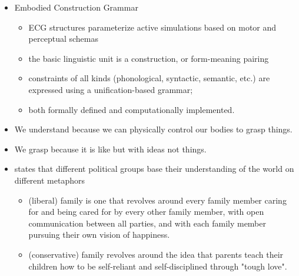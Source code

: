 \documentclass[a4paper,landscape,headrule,footrule,xetex]{foils}
\begin{document}
\begin{itemize}
\item Embodied Construction Grammar
  \begin{itemize}
  \item  {} ECG structures parameterize active simulations based on motor and perceptual schemas
  \item {} the basic linguistic unit is a construction, or form-meaning pairing
  \item {} constraints of all kinds (phonological, syntactic, semantic, etc.) are expressed using a unification-based grammar;
  \item {} both formally defined and computationally implemented. 
  \end{itemize}
\item We understand  because we can physically control our
  bodies to grasp things.
\item We grasp  because it is like  but with ideas not things.
\end{itemize}


\begin{itemize}
\item \citet{Lakoff:1995} states that different political groups base their
  understanding of the world on different metaphors
  \begin{itemize}
  \item {} (liberal) family is one that revolves
    around every family member caring for and being cared for by every
    other family member, with open communication between all parties,
    and with each family member pursuing their own vision of
    happiness.
  \item {} (conservative) family revolves around the idea that parents teach their children how to be self-reliant and self-disciplined through "tough love". 
  \end{itemize}
\end{itemize}

\end{document}
